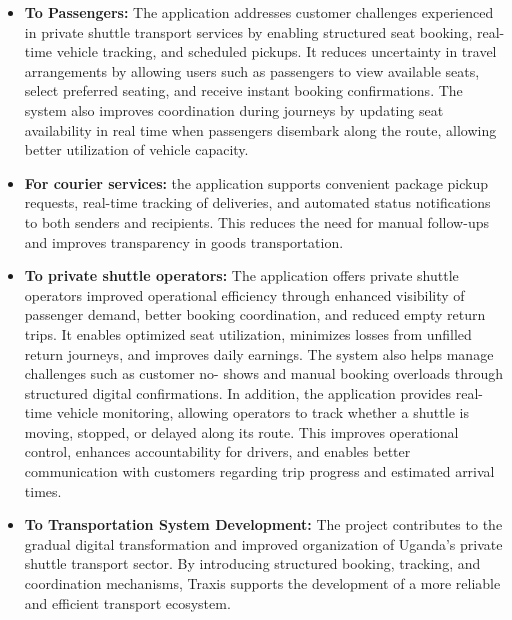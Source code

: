 \begin{itemize}
 \item \textbf{To Passengers:} The application addresses customer
        challenges experienced in private shuttle transport services by enabling
        structured seat booking, real-time vehicle tracking, and scheduled
        pickups. It reduces uncertainty in travel arrangements by allowing users
        such as passengers to view available seats, select preferred seating,
        and receive instant booking confirmations. The system also improves
        coordination during journeys by updating seat availability in real time
        when passengers disembark along the route, allowing better utilization
        of vehicle capacity.

 \item \textbf{For courier services:} the application supports convenient
        package pickup requests, real-time tracking of deliveries, and automated
        status notifications to both senders and recipients. This reduces the
        need for manual follow-ups and improves transparency in goods
        transportation.

 \item \textbf{To private shuttle operators:} The application offers
        private shuttle operators improved operational efficiency through
        enhanced visibility of passenger demand, better booking coordination,
        and reduced empty return trips. It enables optimized seat utilization,
        minimizes losses from unfilled return journeys, and improves daily
        earnings. The system also helps manage challenges such as customer no-
        shows and manual booking overloads through structured digital
        confirmations.
In addition, the application provides real-time vehicle monitoring, allowing
operators to track whether a shuttle is moving, stopped, or delayed along its
route. This improves operational control, enhances accountability for drivers,
and enables better communication with customers regarding trip progress and
estimated arrival times.


 \item \textbf{To Transportation System Development:} The project
        contributes to the gradual digital transformation and improved
        organization of Uganda’s private shuttle transport sector. By
        introducing structured booking, tracking, and coordination mechanisms,
        Traxis supports the development of a more reliable and efficient
        transport ecosystem.


\end{itemize}
